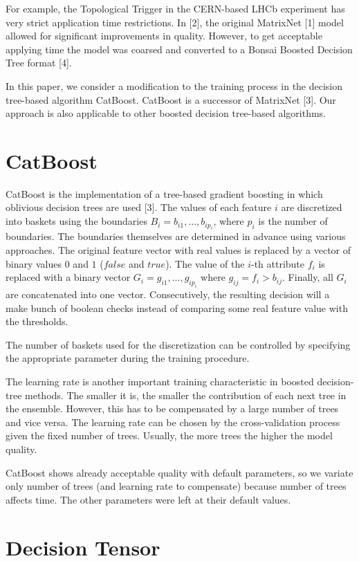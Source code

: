 \documentclass[a4paper]{jpconf}
\begin{document}
For example, the Topological Trigger in the CERN-based LHCb experiment has very strict application time restrictions. In [2], the original MatrixNet [1] model allowed for significant improvements in quality. However, to get acceptable applying time the model was coarsed and converted to a Bonsai Boosted Decision Tree format [4].

In this paper, we consider a modification to the training process in the decision tree-based algorithm CatBoost. CatBoost is a successor of MatrixNet [3]. Our approach is also applicable to other boosted decision tree-based algorithms.

\section{CatBoost}

CatBoost is the implementation of a tree-based gradient boosting in which oblivious decision trees are used [3]. The values of each feature $i$ are discretized into baskets using the boundaries $B_i={b_{i1},...,b_{ip_i}}$, where $p_i$ is the number of boundaries. The boundaries themselves are determined in advance using various approaches.
The original feature vector with real values is replaced by a vector of binary values $0$ and $1$ ($false$ and $true$). The value of the $i$-th attribute $f_i$ is replaced with a binary vector $G_i={g_{i1},...,g_{ip_i}}$ where $g_{ij} = f_i > b_{ij}$. Finally, all $G_i$ are concatenated into one vector. Consecutively, the resulting decision will a make bunch of boolean checks instead of comparing some real feature value with the thresholds.

The number of baskets used for the discretization can be controlled by specifying the appropriate parameter during the training procedure.

The learning rate is another important training characteristic in boosted decision-tree methods. The smaller it is, the smaller the contribution of each next tree in the ensemble. However, this has to be compensated by a large number of trees and vice versa. The learning rate can be chosen by the cross-validation process given the fixed number of trees. Usually, the more trees the higher the model quality.

CatBoost shows already acceptable quality with default parameters, so we variate only number of trees (and learning rate to compensate) because number of trees affects time. The other parameters were left at their default values.

\section{Decision Tensor}
\end{document}
